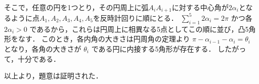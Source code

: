 \documentclass[../../main.tex]{subfiles}
\begin{document}
そこで，任意の円を1つとり，その円周上に弧$A_i A_{i+1}$に対する中心角が$2\alpha_i$となるように点$A_1, A_2, A_3, A_4, A_5$を反時計回りに順にとる．
$\sum_{i=1}^5 2\alpha_i = 2\pi$ かつ各 $2\alpha_i > 0$ であるから，これらは円周上に相異なる5点としてこの順に並び，凸5角形をなす．
このとき，各内角の大きさは円周角の定理より $\pi - \alpha_{i-1} - \alpha_i = \theta_i$ となり，各角の大きさが $\theta_i$ である円に内接する5角形が存在する．
したがって，十分である．

以上より，題意は証明された．
\end{document}
